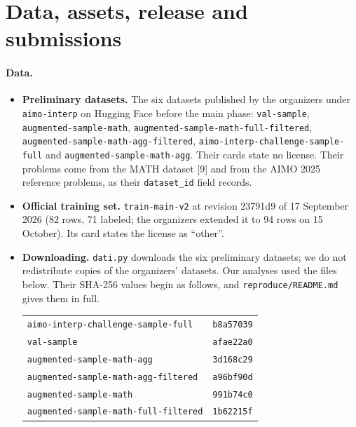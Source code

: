 \section{Data, assets, release and submissions}\label{app:E}

\paragraph{Data.}
\begin{itemize}
\item \textbf{Preliminary datasets.} The six datasets published by the organizers under \texttt{aimo-interp} on Hugging Face before the main phase: \texttt{val-sample}, \texttt{augmented-sample-math}, \texttt{augmented-sample-math-full-filtered}, \texttt{augmented-sample-math-agg-filtered}, \texttt{aimo-interp-challenge-sample-full} and \texttt{augmented-sample-math-agg}. Their cards state no license. Their problems come from the MATH dataset [9] and from the AIMO 2025 reference problems, as their \texttt{dataset\_id} field records.
\item \textbf{Official training set.} \texttt{train-main-v2} at revision 23791d9 of 17 September 2026 (82 rows, 71 labeled; the organizers extended it to 94 rows on 15 October). Its card states the license as ``other''.
\item \textbf{Downloading.} \texttt{dati.py} downloads the six preliminary datasets; we do not redistribute copies of the organizers' datasets. Our analyses used the files below. Their SHA-256 values begin as follows, and \texttt{reproduce/README.md} gives them in full.

\smallskip
{\small\begin{tabular}{@{}ll@{}}
\texttt{aimo-interp-challenge-sample-full} & \texttt{b8a57039} \\
\texttt{val-sample} & \texttt{afae22a0} \\
\texttt{augmented-sample-math-agg} & \texttt{3d168c29} \\
\texttt{augmented-sample-math-agg-filtered} & \texttt{a96bf90d} \\
\texttt{augmented-sample-math} & \texttt{991b74c0} \\
\texttt{augmented-sample-math-full-filtered} & \texttt{1b62215f} \\
\end{tabular}}
\end{itemize}

